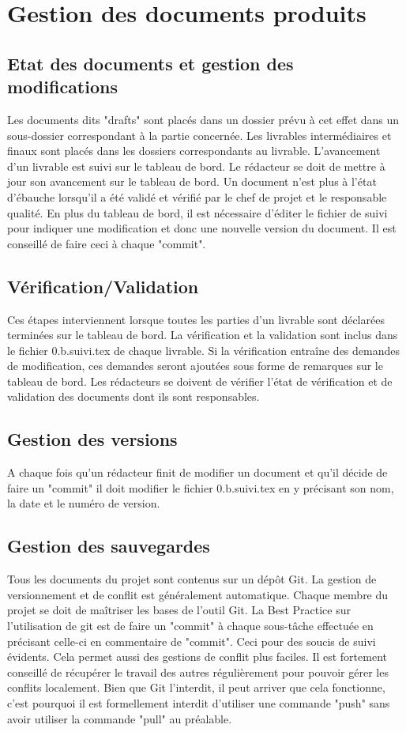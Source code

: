 \section{Gestion des documents produits}
\subsection{Etat des documents et gestion des modifications}
Les documents dits "drafts" sont placés dans un dossier prévu à cet effet dans
un sous-dossier correspondant à la partie concernée. 
Les livrables intermédiaires et finaux sont placés dans les dossiers 
correspondants au livrable.
L'avancement d'un livrable est suivi sur le tableau de bord. Le rédacteur se
doit de mettre à jour son avancement sur le tableau de bord.
Un document n'est plus à l'état d'ébauche lorsqu'il a été validé et vérifié par 
le chef de projet et le responsable qualité.
En plus du tableau de bord, il est nécessaire d'éditer le fichier de suivi
pour indiquer une modification et donc une nouvelle version du document. Il est
conseillé de faire ceci à chaque "commit".

\subsection{Vérification/Validation}
Ces étapes interviennent lorsque toutes les parties d'un livrable sont 
déclarées terminées sur le tableau de bord.
La vérification et la validation sont inclus dans le fichier 0.b.suivi.tex de 
chaque livrable. Si la vérification entraîne des demandes de modification, 
ces demandes seront ajoutées sous forme de remarques sur le tableau de bord.
Les rédacteurs se doivent de vérifier l'état de vérification et de validation
des documents dont ils sont responsables.

\subsection{Gestion des versions}
A chaque fois qu'un rédacteur finit de modifier un document et qu'il décide 
de faire un "commit" il doit modifier le fichier 0.b.suivi.tex en y précisant 
son nom, la date et le numéro de version.

\subsection{Gestion des sauvegardes}
Tous les documents du projet sont contenus sur un dépôt Git. 
La gestion de versionnement et de conflit est généralement automatique. 
Chaque membre du projet se doit de maîtriser les bases de l'outil Git.
La Best Practice sur l'utilisation de git est de faire un "commit" à chaque 
sous-tâche effectuée en précisant celle-ci en commentaire de "commit". Ceci 
pour des soucis de suivi évidents. Cela permet aussi des gestions de conflit
plus faciles.
Il est fortement conseillé de récupérer le travail des autres régulièrement
pour pouvoir gérer les conflits localement.
Bien que Git l'interdit, il peut arriver que cela fonctionne, c'est pourquoi
il est formellement interdit d'utiliser une commande "push" sans avoir utiliser
la commande "pull" au préalable.
